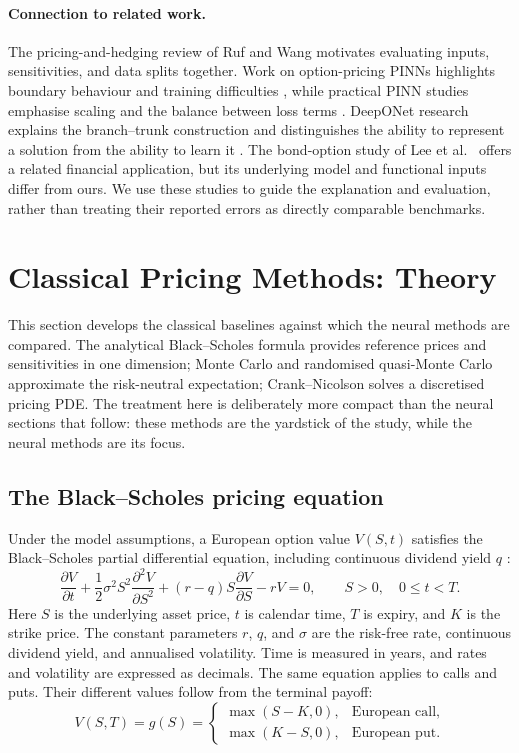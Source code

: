 \documentclass[11pt,a4paper]{article}
\begin{document}
\paragraph{Connection to related work.}
The pricing-and-hedging review of Ruf and Wang \cite{ruf2020} motivates evaluating inputs, sensitivities, and data splits together. Work on option-pricing PINNs highlights boundary behaviour and training difficulties \cite{dhiman2023}, while practical PINN studies emphasise scaling and the balance between loss terms \cite{expert2023}. DeepONet research explains the branch--trunk construction and distinguishes the ability to represent a solution from the ability to learn it \cite{lu2021}. The bond-option study of Lee et al.\ \cite{lee2026} offers a related financial application, but its underlying model and functional inputs differ from ours. We use these studies to guide the explanation and evaluation, rather than treating their reported errors as directly comparable benchmarks.


\section{Classical Pricing Methods: Theory}
\label{sec:classical-theory}

This section develops the classical baselines against which the neural
methods are compared. The analytical Black--Scholes formula provides
reference prices and sensitivities in one dimension; Monte Carlo and
randomised quasi-Monte Carlo approximate the risk-neutral expectation;
Crank--Nicolson solves a discretised pricing PDE. The treatment here is deliberately
more compact than the neural sections that follow: these methods are the
yardstick of the study, while the neural methods are its focus.

\subsection{The Black--Scholes pricing equation}
Under the model assumptions, a European option value $V(S,t)$ satisfies the
Black--Scholes partial differential equation, including continuous dividend
yield $q$ \cite{black1973,merton1973}:
\begin{equation}
\boxed{
\frac{\partial V}{\partial t}
+\frac{1}{2}\sigma^2S^2\frac{\partial^2 V}{\partial S^2}
+(r-q)S\frac{\partial V}{\partial S}
-rV=0,
\qquad S>0,\quad 0\leq t<T.
}
\label{eq:bs-calendar-pde}
\end{equation}
Here $S$ is the underlying asset price, $t$ is calendar time, $T$ is expiry,
and $K$ is the strike price. The constant parameters $r$, $q$, and $\sigma$
are the risk-free rate, continuous dividend yield, and annualised volatility.
Time is measured in years, and rates and volatility are expressed as decimals. The same equation applies to calls and
puts. Their different values follow from the terminal payoff:
\begin{equation}
V(S,T)=g(S)=
\begin{cases}
\max(S-K,0), & \text{European call},\\
\max(K-S,0), & \text{European put}.
\end{cases}
\label{eq:bs-terminal-payoff}
\end{equation}
\end{document}
